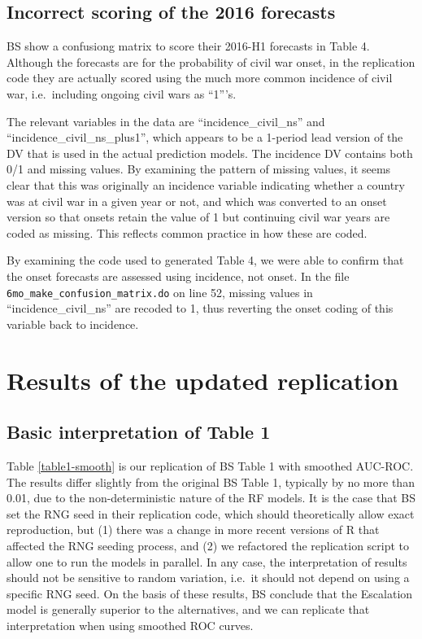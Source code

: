 \documentclass[]{article}
\begin{document}
\hypertarget{incorrect-scoring-of-the-2016-forecasts}{%
\subsection{Incorrect scoring of the 2016
forecasts}\label{incorrect-scoring-of-the-2016-forecasts}}

BS show a confusiong matrix to score their 2016-H1 forecasts in Table 4.
Although the forecasts are for the probability of civil war onset, in
the replication code they are actually scored using the much more common
incidence of civil war, i.e.~including ongoing civil wars as ``1'''s.

The relevant variables in the data are ``incidence\_civil\_ns'' and
``incidence\_civil\_ns\_plus1'', which appears to be a 1-period lead
version of the DV that is used in the actual prediction models. The
incidence DV contains both 0/1 and missing values. By examining the
pattern of missing values, it seems clear that this was originally an
incidence variable indicating whether a country was at civil war in a
given year or not, and which was converted to an onset version so that
onsets retain the value of 1 but continuing civil war years are coded as
missing. This reflects common practice in how these are coded.

By examining the code used to generated Table 4, we were able to confirm
that the onset forecasts are assessed using incidence, not onset. In the
file \texttt{6mo\_make\_confusion\_matrix.do} on line 52, missing values
in ``incidence\_civil\_ns'' are recoded to 1, thus reverting the onset
coding of this variable back to incidence.

\hypertarget{results-of-the-updated-replication}{%
\section{Results of the updated
replication}\label{results-of-the-updated-replication}}

\hypertarget{basic-interpretation-of-table-1}{%
\subsection{Basic interpretation of Table
1}\label{basic-interpretation-of-table-1}}

Table \ref{table1-smooth} is our replication of BS Table 1 with smoothed
AUC-ROC. The results differ slightly from the original BS Table 1,
typically by no more than 0.01, due to the non-deterministic nature of
the RF models. It is the case that BS set the RNG seed in their
replication code, which should theoretically allow exact reproduction,
but (1) there was a change in more recent versions of R that affected
the RNG seeding process, and (2) we refactored the replication script to
allow one to run the models in parallel. In any case, the interpretation
of results should not be sensitive to random variation, i.e.~it should
not depend on using a specific RNG seed. On the basis of these results,
BS conclude that the Escalation model is generally superior to the
alternatives, and we can replicate that interpretation when using
smoothed ROC curves.
\end{document}
